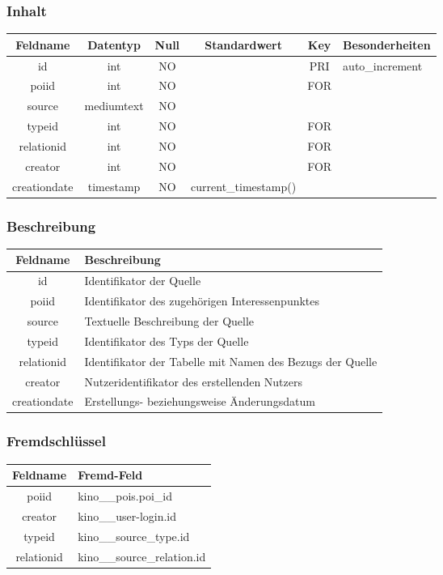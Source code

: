 \subsubsection{Inhalt}
\begin{table}[H]
	\begin{tabular}{|c|c|c|c|c|p{3.5cm}|}
		\hline
		\textbf{Feldname} & \textbf{Datentyp} & \textbf{Null} & \textbf{Standardwert} & \textbf{Key}   & \textbf{Besonderheiten} \\ \hline
		id & int & NO &  & PRI & auto\_increment \\ \hline
		poiid & int & NO &  & FOR & \\ \hline
		source & mediumtext & NO &  &  & \\ \hline
		typeid & int & NO &  & FOR & \\ \hline
		relationid & int & NO &  & FOR & \\ \hline
		creator & int & NO &  & FOR & \\ \hline
		creationdate & timestamp & NO & current\_timestamp() &  & \\ \hline
	\end{tabular}
\end{table}
\subsubsection{Beschreibung}
\begin{table}[H]
	\begin{tabular}{|c|p{12cm}|}
		\hline
		\textbf{Feldname} & \textbf{Beschreibung} \\ \hline
		id & Identifikator der Quelle \\ \hline
		poiid & Identifikator des zugehörigen Interessenpunktes\\ \hline
		source & Textuelle Beschreibung der Quelle \\ \hline
		typeid & Identifikator des Typs der Quelle \\ \hline
		relationid & Identifikator der Tabelle mit Namen des Bezugs der Quelle \\ \hline
		creator & Nutzeridentifikator des erstellenden Nutzers \\ \hline
		creationdate & Erstellungs- beziehungsweise Änderungsdatum \\ \hline
	\end{tabular}
\end{table}
\subsubsection{Fremdschlüssel}
\begin{table}[H]
	\begin{tabular}{|c|p{12.5cm}|}
		\hline
		\textbf{Feldname} & \textbf{Fremd-Feld} \\ \hline
		poiid & kino\_\_pois.poi\_id \\ \hline
		creator & kino\_\_user-login.id \\ \hline
		typeid & kino\_\_source\_type.id \\ \hline
		relationid & kino\_\_source\_relation.id \\ \hline
	\end{tabular}
\end{table}
